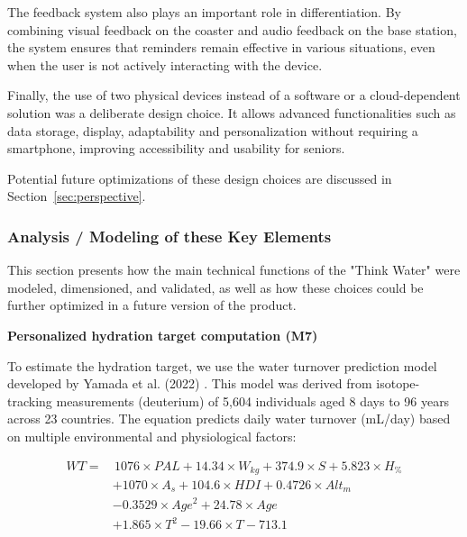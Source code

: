 \documentclass{article}
\begin{document}
The feedback system also plays an important role in differentiation. By combining visual feedback on the coaster and audio feedback on the base station, the system ensures that reminders remain effective in various situations, even when the user is not actively interacting with the device.\vspace{0.2cm}

Finally, the use of two physical devices instead of a software or a cloud-dependent solution was a deliberate design choice. It allows advanced functionalities such as data storage, display, adaptability and personalization without requiring a smartphone, improving accessibility and usability for seniors.\vspace{0.2cm}

Potential future optimizations of these design choices are discussed in Section~\ref{sec:perspective}.

\subsubsection{Analysis / Modeling of these Key Elements}

This section presents how the main technical functions of the "Think Water" were modeled, dimensioned, and validated, as well as how these choices could be further optimized in a future version of the product.\vspace{0.2cm}

\noindent \textbf{Personalized hydration target computation (M7)}\vspace{0.2cm}

To estimate the hydration target, we use the water turnover prediction model developed by Yamada et al. (2022) \cite{WaterTurnover2022}. This model was derived from isotope-tracking measurements (deuterium) of 5,604 individuals aged 8 days to 96 years across 23 countries. The equation predicts daily water turnover (mL/day) based on multiple environmental and physiological factors:

\begin{equation}
\begin{split}
WT = & \, 1076 \times PAL + 14.34 \times W_{kg} + 374.9 \times S + 5.823 \times H_{\%} \\
     & + 1070 \times A_s + 104.6 \times HDI + 0.4726 \times Alt_m \\
     & - 0.3529 \times Age^2 + 24.78 \times Age \\
     & + 1.865 \times T^2 - 19.66 \times T - 713.1
\end{split}
\end{equation}
\end{document}
